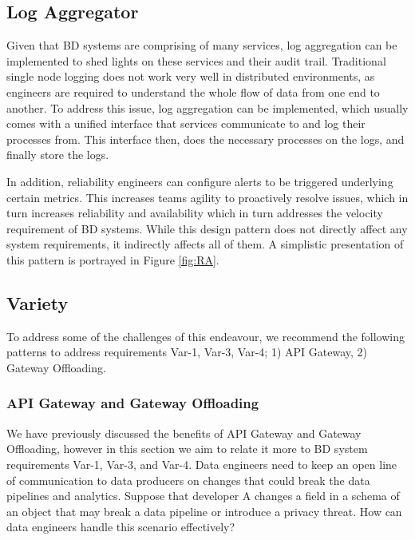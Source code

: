 \documentclass[a4paper,11pt,article,oneside]{memoir}
\begin{document}
\subsection{Log Aggregator}

Given that BD systems are comprising of many services, log aggregation can be implemented to shed lights on these services and their audit trail. Traditional single node logging does not work very well in distributed environments, as engineers are required to understand the whole flow of data from one end to another. To address this issue, log aggregation can be implemented, which usually comes with a unified interface that services communicate to and log their processes from. This interface then, does the necessary processes on the logs, and finally store the logs. 

In addition, reliability engineers can configure alerts to be triggered underlying certain metrics. This increases teams agility to proactively resolve issues, which in turn increases reliability and availability which in turn addresses the velocity requirement of BD systems. While this design pattern does not directly affect any system requirements, it indirectly affects all of them. A simplistic presentation of this pattern is portrayed in Figure \ref{fig:RA}. 




\subsection{Variety}
To address some of the challenges of this endeavour, we recommend the following patterns to address requirements Var-1, Var-3, Var-4; 1) API Gateway, 2) Gateway Offloading.

\subsubsection{API Gateway and Gateway Offloading}

We have previously discussed the benefits of API Gateway and Gateway Offloading, however in this section we aim to relate it more to BD system requirements Var-1, Var-3, and Var-4. Data engineers need to keep an open line of communication to data producers on changes that could break the data pipelines and analytics. Suppose that developer A changes a field in a schema of an object that may break a data pipeline or introduce a privacy threat. How can data engineers handle this scenario effectively? 
\end{document}
